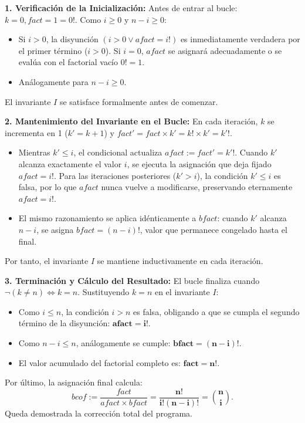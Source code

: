 \begin{solucion}
\textbf{1. Verificación de la Inicialización:}
Antes de entrar al bucle: $k = 0, fact = 1 = 0!$.
Como $i \ge 0$ y $n - i \ge 0$:
\begin{itemize}
    \item Si $i > 0$, la disyunción $(i > 0 \lor afact = i!)$ es inmediatamente verdadera por el primer término ($i > 0$). Si $i = 0$, $afact$ se asignará adecuadamente o se evalúa con el factorial vacío $0! = 1$.
    \item Análogamente para $n - i \ge 0$.
\end{itemize}
El invariante $I$ se satisface formalmente antes de comenzar.

\textbf{2. Mantenimiento del Invariante en el Bucle:}
En cada iteración, $k$ se incrementa en 1 ($k' = k + 1$) y $fact' = fact \times k' = k! \times k' = k'!$.
\begin{itemize}
    \item Mientras $k' \le i$, el condicional actualiza $afact := fact' = k'!$. Cuando $k'$ alcanza exactamente el valor $i$, se ejecuta la asignación que deja fijado $afact = i!$. Para las iteraciones posteriores ($k' > i$), la condición $k' \le i$ es falsa, por lo que $afact$ nunca vuelve a modificarse, preservando eternamente $afact = i!$.
    \item El mismo razonamiento se aplica idénticamente a $bfact$: cuando $k'$ alcanza $n - i$, se asigna $bfact = (n - i)!$, valor que permanece congelado hasta el final.
\end{itemize}
Por tanto, el invariante $I$ se mantiene inductivamente en cada iteración.

\textbf{3. Terminación y Cálculo del Resultado:}
El bucle finaliza cuando $\neg(k \neq n) \iff k = n$.
Sustituyendo $k = n$ en el invariante $I$:
\begin{itemize}
    \item Como $i \le n$, la condición $i > n$ es falsa, obligando a que se cumpla el segundo término de la disyunción: $\mathbf{afact = i!}$.
    \item Como $n - i \le n$, análogamente se cumple: $\mathbf{bfact = (n - i)!}$.
    \item El valor acumulado del factorial completo es: $\mathbf{fact = n!}$.
\end{itemize}

Por último, la asignación final calcula:
\[
bcof := \frac{fact}{afact \times bfact} = \mathbf{\frac{n!}{i! (n - i)!}} = \mathbf{\binom{n}{i}}.
\]
Queda demostrada la corrección total del programa.
\end{solucion}

